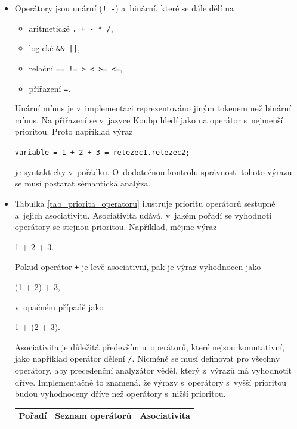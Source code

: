 \begin{itemize}
    \item Operátory jsou unární (\texttt{! -}) a~binární, které se dále dělí na
    \begin{itemize}[label=$\circ$]
        \item aritmetické \texttt{. + - * /},
        \item logické \texttt{\&\& ||},
        \item relační \texttt{== != > < >= <=},
        \item přiřazení \texttt{=}.
    \end{itemize}
    Unární mínus je v~implementaci reprezentováno jiným tokenem než binární mínus.
    Na přiřazení se v~jazyce Koubp hledí jako na operátor s~nejmenší prioritou.
    Proto například výraz
    \begin{center}
        \texttt{variable = 1 + 2 + 3 = retezec1.retezec2;}
    \end{center}
    je syntakticky v~pořádku.
    O~dodatečnou kontrolu správnosti tohoto výrazu se musí postarat sémantická analýza. 
    \item Tabulka \ref{tab_priorita_operatoru} ilustruje prioritu operátorů sestupně a~jejich asociativitu.
    Asociativita udává, v~jakém pořadí se vyhodnotí operátory se stejnou prioritou.
    Například, mějme výraz
    \begin{center}
        1 + 2 + 3.
    \end{center}
    Pokud operátor \texttt{+} je levě asociativní, pak je výraz vyhodnocen jako
    \begin{center}
        (1 + 2) + 3,
    \end{center}
    v~opačném případě jako
    \begin{center}
        1 + (2 + 3).
    \end{center}
    Asociativita je důležitá především u~operátorů, které nejsou komutativní, jako například operátor dělení \texttt{/}.
    Nicméně se musí definovat pro všechny operátory, aby precedenční analyzátor věděl, který z~výrazů má vyhodnotit dříve.
    Implementačně to znamená, že výrazy s~operátory s~vyšší prioritou budou vyhodnoceny dříve než operátory s~nižší prioritou.
    \begin{table}[ht]
        \centering
        \begin{tabularx}{0.7\textwidth}{p{}p{}X}
            \toprule
            \textbf{Pořadí} & \textbf{Seznam operátorů} & \textbf{Asociativita} \\

\end{tabularx}
\end{table}
\end{itemize}
